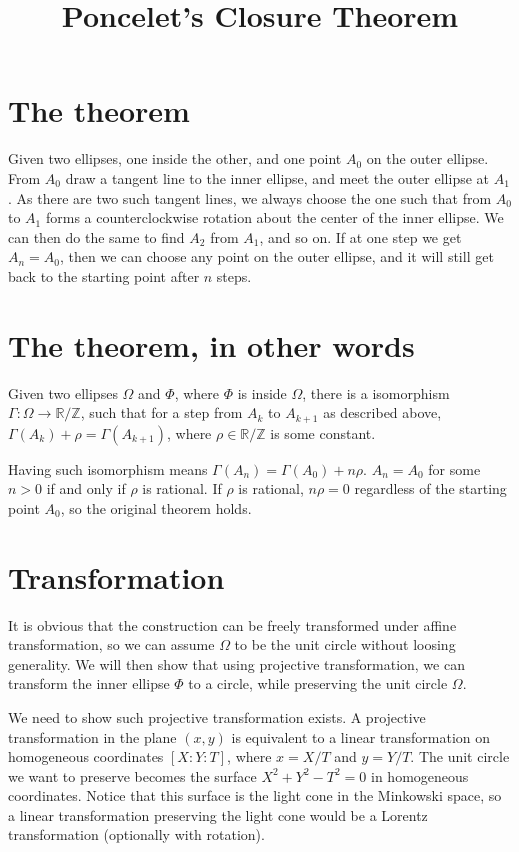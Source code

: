 \documentclass[]{article}
\title{Poncelet's Closure Theorem}
\begin{document}
\maketitle

\section{The theorem}
Given two ellipses, one inside the other, and one point $A_0$ on the outer ellipse. From $A_0$ draw a tangent line to the inner ellipse, and meet the outer ellipse at $A_1$. As there are two such tangent lines, we always choose the one such that from $A_0$ to $A_1$ forms a counterclockwise rotation about the center of the inner ellipse. We can then do the same to find $A_2$ from $A_1$, and so on. If at one step we get $A_n = A_0$, then we can choose any point on the outer ellipse, and it will still get back to the starting point after $n$ steps.

\section{The theorem, in other words}
Given two ellipses $\Omega$ and $\Phi$, where $\Phi$ is inside $\Omega$, there is a isomorphism $\Gamma: \Omega\to \mathbb{R}/\mathbb{Z}$, such that for a step from $A_k$ to $A_{k+1}$ as described above, $\Gamma(A_k) + \rho = \Gamma(A_{k+1})$, where $\rho \in \mathbb{R}/\mathbb{Z}$ is some constant.

Having such isomorphism means $\Gamma(A_n) = \Gamma(A_0) + n\rho$. $A_n = A_0$ for some $n > 0$ if and only if $\rho$ is rational. If $\rho$ is rational, $n\rho = 0$ regardless of the starting point $A_0$, so the original theorem holds.

\section{Transformation}
It is obvious that the construction can be freely transformed under affine transformation, so we can assume $\Omega$ to be the unit circle without loosing generality. We will then show that using projective transformation, we can transform the inner ellipse $\Phi$ to a circle, while preserving the unit circle $\Omega$.

 
We need to show such projective transformation exists. A projective transformation in the plane $(x, y)$ is equivalent to a linear transformation on homogeneous coordinates $[X:Y:T]$, where $x = X/T$ and $y = Y/T$. The unit circle we want to preserve becomes the surface $X^2+Y^2-T^2 = 0$ in homogeneous coordinates. Notice that this surface is the light cone in the Minkowski space, so a linear transformation preserving the light cone would be a Lorentz transformation (optionally with rotation).
\end{document}
